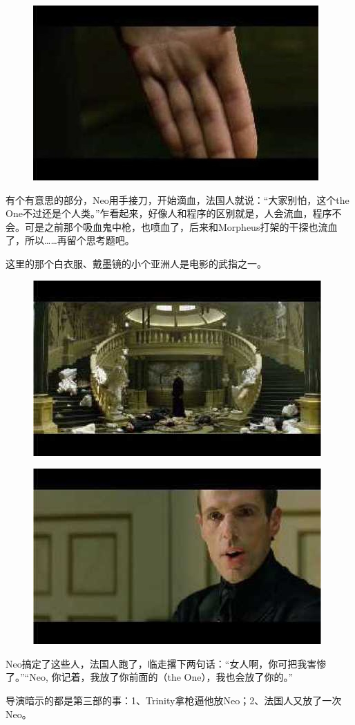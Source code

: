 \documentclass[UTF8]{ctexart}
\begin{document}
\begin{figure}[htb]
\centering
\includegraphics[width=0.5\linewidth]{fig/read_reloaded-123-2}
\end{figure}

有个有意思的部分，Neo用手接刀，开始滴血，法国人就说：“大家别怕，这个the One不过还是个人类。”乍看起来，好像人和程序的区别就是，人会流血，程序不会。可是之前那个吸血鬼中枪，也喷血了，后来和Morpheus打架的干探也流血了，所以……再留个思考题吧。

这里的那个白衣服、戴墨镜的小个亚洲人是电影的武指之一。

\begin{figure}[htb]
\centering
\includegraphics[width=0.5\linewidth]{fig/read_reloaded-124}
\end{figure}

\begin{figure}[htb]
\centering
\includegraphics[width=0.5\linewidth]{fig/read_reloaded-125}
\end{figure}

Neo搞定了这些人，法国人跑了，临走撂下两句话：“女人啊，你可把我害惨了。”“Neo, 你记着，我放了你前面的（the One），我也会放了你的。”

导演暗示的都是第三部的事：1、Trinity拿枪逼他放Neo；2、法国人又放了一次Neo。
\end{document}
